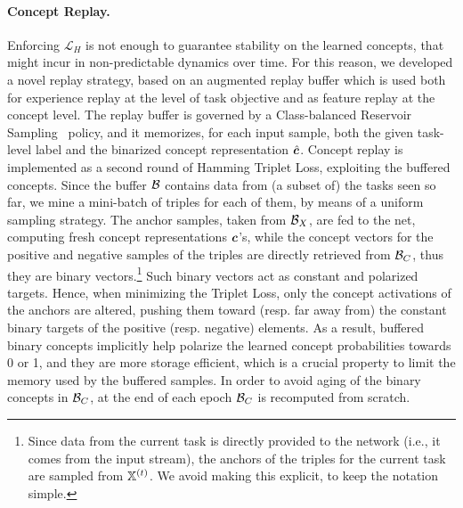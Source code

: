 \paragraph{Concept Replay.} Enforcing $\mathcal{L}_H$ is not enough to guarantee stability on the learned concepts, that might incur in non-predictable dynamics over time. For this reason, we developed a novel replay strategy, based on an augmented replay buffer which is used both for experience replay at the level of task objective and as feature replay at the concept level. The replay buffer is governed by a Class-balanced Reservoir Sampling~\cite{chrysakis2020online} policy, and it memorizes, for each input sample, both the given task-level label and the binarized concept representation $\hat{{\bm{c}}}$. %
%
Concept replay is implemented as a second round of Hamming Triplet Loss, exploiting the buffered concepts. Since the buffer ${\mathcal{B}}$ contains data from (a subset of) the tasks seen so far, we mine a mini-batch of triples for each of them, by means of a uniform sampling strategy. %
The anchor samples, taken from ${\mathcal{B}}_X$, are fed to the net, computing fresh concept representations ${\bm{c}}$'s, while the concept vectors for the positive and negative samples of the triples are directly retrieved from ${\mathcal{B}}_{C}$, thus they are binary vectors.\footnote{Since data from the current task is directly provided to the network (i.e., it comes from the input stream), the anchors of the triples for the current task are sampled from ${\mathbb{X}}^{(t)}$. We avoid making this explicit, to keep the notation simple.} Such binary vectors act as constant and polarized targets. Hence, when minimizing the Triplet Loss, only the concept activations of the anchors are altered, pushing them toward (resp. far away from) the constant binary targets of the positive (resp. negative) elements. As a result, buffered binary concepts implicitly help polarize the learned concept probabilities towards 0 or 1, and they are more storage efficient, which is a crucial property to limit the memory used by the buffered samples. In order to avoid aging of the binary concepts in ${\mathcal{B}}_{C}$, at the end of each epoch ${\mathcal{B}}_{C}$ is recomputed from scratch. %

